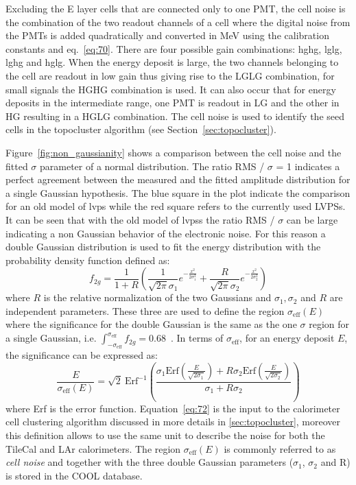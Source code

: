 Excluding the E layer cells that are connected only to one PMT, the cell noise
is the combination of the two readout channels of a cell where the digital noise
from the PMTs is added quadratically and converted in MeV using the calibration
constants and eq.~\eqref{eq:70}. There are four possible gain combinations:
\gls{hghg}, \gls{lglg}, \gls{lghg} and \gls{hglg}. When the energy deposit is
large, the two channels belonging to the cell are readout in low gain thus
giving rise to the LGLG combination, for small signals the HGHG combination is
used. It can also occur that for energy deposits in the intermediate range, one
PMT is readout in LG and the other in HG resulting in a HGLG combination. The
cell noise is used to identify the seed cells in the topocluster algorithm (see
Section~\ref{sec:topocluster}).

Figure~\ref{fig:non_gaussianity} shows a comparison between the cell noise and
the fitted $\sigma$ parameter of a normal distribution. The ratio RMS / $\sigma$
= 1 indicates a perfect agreement between the measured and the fitted amplitude
distribution for a single Gaussian hypothesis. The blue square in the plot
indicate the comparison for an old model of \gls{lvps} while the red square
refers to the currently used LVPSs. It can be seen that with the old model of
\glspl{lvps} the ratio RMS / $\sigma$ can be large indicating a non Gaussian
behavior of the electronic noise. For this reason a double Gaussian distribution
is used to fit the energy distribution with the probability density function
defined as:
\begin{equation}
  \label{eq:71}
  f_{2g} = \frac{1}{1 + R} \left( \frac{1}{\sqrt{2 \pi} \sigma_1} e^{-
      \frac{x^2}{2 \sigma_1^2}} + \frac{R}{\sqrt{2 \pi} \sigma_2} e^{-
      \frac{x^2}{2 \sigma_2^2}} \right)
\end{equation}
where $R$ is the relative normalization of the two Gaussians and
$\sigma_1, \sigma_2$ and $R$ are independent parameters. These three are used to
define the region $\sigma_{\text{eff}}(E)$ where the significance for the double
Gaussian is the same as the one $\sigma$ region for a single Gaussian,
i.e.
$\int_{- \sigma_{\text{eff}}}^{\sigma_{\text{eff}}} f_{2g} =
0.68$~\cite{TileReadiness}.
In terms of $\sigma_{\text{eff}}$, for an energy deposit $E$, the significance
can be expressed as:
\begin{equation}
  \label{eq:72}
  \frac{E}{\sigma_{\text{eff}}(E)} = \sqrt{2}\ \text{Erf}^{- 1} \left( \frac{\sigma_1
      \text{Erf} \left(\frac{E}{\sqrt{2 \sigma_1}} \right) + R \sigma_2 \text{Erf}
    \left( \frac{E}{\sqrt{2 \sigma_2}} \right)}{\sigma_1 + R \sigma_2} \right)
\end{equation}
where Erf is the error function. Equation~\ref{eq:72} is the input to the
calorimeter cell clustering algorithm discussed in more details in
\cref{sec:topocluster}, moreover this definition allows to use the same unit to
describe the noise for both the TileCal and LAr calorimeters. The region
$\sigma_{\text{eff}}(E)$ is commonly referred to as \emph{cell noise} and
together with the three double Gaussian parameters ($\sigma_1$, $\sigma_2$ and
R) is stored in the COOL database.

